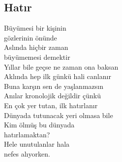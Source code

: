 \subsection{Hatır}

Büyümesi bir kişinin \\
	gözlerinin önünde \\
Aslında hiçbir zaman \\
	büyümemesi demektir \\
Yıllar bile geçse ne zaman ona baksan \\
Aklında hep ilk günkü hali canlanır \\

\noindent\newline
Buna karşın sen de yaşlanmazsın \\
Anılar kronolojik değildir çünkü \\
En çok yer tutan, ilk hatırlanır \\
Dünyada tutunacak yeri olmasa bile \\

\noindent\newline
Kim ölmüş bu dünyada \\
	hatırlamaktan? \\
Hele unutulanlar hala \\
	nefes alıyorken. \\